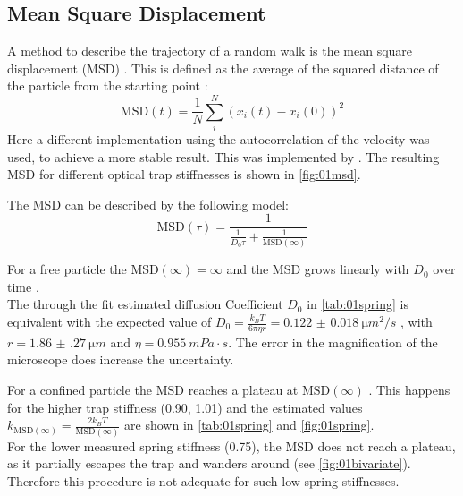 \documentclass[
    twoside=false,
    twocolumn=true,
    fontsize=11pt,
]{scrarticle}
\begin{document}
\subsection*{Mean Square Displacement}
A method to describe the trajectory of a random walk is the mean square displacement (MSD) \cite{wiki:msd}.
This is defined as the average of the squared distance of the particle from the starting point \cite{wiki:msd}:
\begin{equation}
    \text{MSD}(t) = \frac{1}{N} \sum_i^N \left( x_i\left(t\right) - x_i\left(0\right) \right)^2 
\end{equation}
Here a different implementation using the autocorrelation of the velocity was used, to achieve a more stable result.
This was implemented by \cite{jl:msd}.
The resulting MSD for different optical trap stiffnesses is shown in \autoref{fig:01msd}.

The MSD can be described by the following model:
\begin{equation}
    \text{MSD}(\tau) = \frac{1}{\frac{1}{D_0 \tau} + \frac{1}{\text{MSD}(\infty)}}
    \label{eq:01_mdl_msd} 
\end{equation}

For a free particle the $\text{MSD}(\infty)=\infty$ and the MSD grows linearly with $D_0$ over time \cite{wiki:msd,instructions}.\\
The through the fit estimated diffusion Coefficient $D_0$ in \autoref{tab:01spring} is equivalent with the expected value of $D_0 = \frac{k_B T}{6 \pi \eta r} = \SI{0.122(18)}{\micro m ^2 / s}$ \cite{instructions}, with $r = \SI{1.86(27)}{\micro m}$ and $\eta = \SI{0.955}{mPa\cdot s}$\cite{n:water}.
The error in the magnification of the microscope does increase the uncertainty.

For a confined particle the MSD reaches a plateau at $\text{MSD}(\infty)$ \cite{instructions}.
This happens for the higher trap stiffness (\SI{0.90}{}, \SI{1.01}{}) and the estimated values $k_{\text{MSD}(\infty)} = \frac{2 k_B T}{\text{MSD}(\infty)}$ are shown in  \autoref{tab:01spring} and \autoref{fig:01spring}.\\
For the lower measured spring stiffness (\SI{0.75}{}), the MSD does not reach a plateau, as it partially escapes the trap and wanders around (see \autoref{fig:01bivariate}).
Therefore this procedure is not adequate for such low spring stiffnesses.
\end{document}
